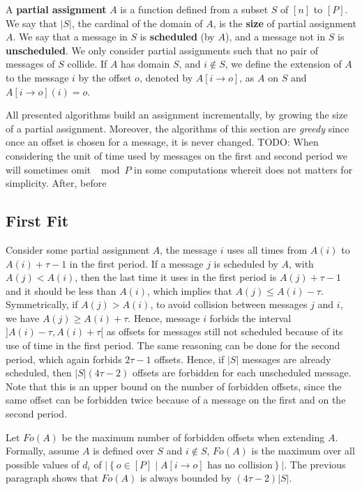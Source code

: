 \documentclass[a4paper,UKenglish,cleveref, autoref, thm-restate]{lipics-v2019}
\newcommand{\todo}[1]{{\color{red} TODO: {#1}}}
\begin{document}
A \textbf{partial assignment} $A$ is a function defined from a subset $S$ of $[n]$ to $[P]$.
We say that $|S|$, the cardinal of the domain of $A$, is the \textbf{size} of partial assignment $A$.
We say that a message in $S$ is \textbf{scheduled} (by $A$), and a message not in $S$ is \textbf{unscheduled}. We only consider partial assignments such that no pair of messages of $S$ collide. If $A$ has domain $S$, and $i \notin S$, we define the extension of $A$ to the message $i$ by the offset $o$, denoted by $A[i \rightarrow o]$, as $A$ on $S$ and $A[i \rightarrow o](i) = o$.

All presented algorithms build an assignment incrementally, by growing the size of a partial assignment. Moreover, the algorithms of this section are \emph{greedy} since once an offset is chosen for a message, it is never changed.
\todo{When considering the unit of time used by messages on the first and second period we will sometimes omit $\mod P$ in 
some computations whereit does not matters for simplicity. After, before}

\subsection{First Fit}


Consider some partial assignment $A$, the message $i$ uses all times from $A(i)$ to $A(i) + \tau -1$ in the first period. If a message $j$ is scheduled by $A$, with $A(j) < A(i)$, then the last time it uses in the first period is $A(j)+\tau-1$ and it should be less than $A(i)$, which implies that $A(j) \leq A(i) - \tau$. Symmetrically, if $A(j) > A(i)$, to avoid collision between messages $j$ and $i$, we have $A(j) \geq A(i) + \tau$. Hence, message $i$ forbids the interval $]A(i) - \tau, A(i) + \tau[$ as offsets for messages still not scheduled because of its use of time in the first period. The same reasoning can be done for the second period, which again forbids $2\tau -1$ offsets. Hence, if $|S|$ messages are already scheduled, then $|S|(4\tau -2)$ offsets are forbidden for each unscheduled message. Note that this is an upper bound on the number of forbidden offsets, since the same offset can be forbidden twice because of a message on the first and on the second period.

Let $Fo(A)$ be the maximum number of forbidden offsets when extending $A$. Formally, assume $A$ is defined over $S$ and $i\notin S$, $Fo(A)$ is the maximum over all possible values of $d_i$ of $|\left\{ o \in [P] \mid A[i \rightarrow o] \text{ has no collision}\right\}|$. The previous paragraph shows that $Fo(A)$ is always bounded by $(4 \tau -2)|S|$. 
\end{document}
